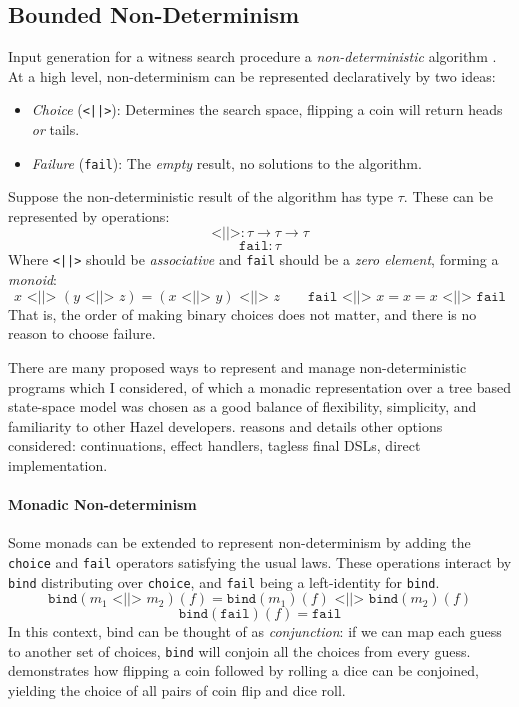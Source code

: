 \subsection{Bounded Non-Determinism}\label{sec:Nondeterminism}
Input generation for a witness search procedure \cite{SearchProc} a \textit{non-deterministic} algorithm \cite{NondeterministicAlgorithms}. At a high level, non-determinism can be represented declaratively by two ideas:
\begin{itemize}
\item \textit{Choice} (\texttt{<||>}): Determines the search space, flipping a coin will return heads \textit{or} tails.
\item \textit{Failure} (\texttt{fail}): The \textit{empty} result, no solutions to the algorithm.
\end{itemize}
Suppose the non-deterministic result of the algorithm has type $\tau$. These can be represented by operations:
\[\texttt{<||>} : \tau \to \tau \to \tau\]
\[\texttt{fail} : \tau\]
Where \texttt{<||>} should be \textit{associative} and \texttt{fail} should be a \textit{zero element}, forming a \textit{monoid}:
\[x \texttt{ <||> } (y \texttt{ <||> } z) = (x \texttt{ <||> } y) \texttt{ <||> } z \qquad \texttt{fail} \texttt{ <||> } x = x = x \texttt{ <||> } \texttt{fail}\]
That is, the order of making binary choices does not matter, and there is no reason to choose failure.

There are many proposed ways to represent and manage non-deterministic programs which I considered, of which a monadic representation over a tree based state-space model was chosen as a good balance of flexibility, simplicity, and familiarity to other Hazel developers.  reasons and details other options considered: continuations, effect handlers, tagless final DSLs, direct implementation.  

\paragraph{Monadic Non-determinism} Some monads can be extended to represent non-determinism by adding the \texttt{choice} and \texttt{fail} operators satisfying the usual laws.
These operations interact by \texttt{bind} distributing over \texttt{choice}, and \texttt{fail} being a left-identity for \texttt{bind}.
\[\texttt{bind}(m_1 \texttt{ <||> } m_2)(f) = \texttt{bind}(m_1)(f) \texttt{ <||> } \texttt{bind}(m_2)(f)\]
\[\texttt{bind}(\texttt{fail})(f) = \texttt{fail}\]
In this context, bind can be thought of as \textit{conjunction}: if we can map each guess to another set of choices, \texttt{bind} will conjoin all the choices from every guess.  demonstrates how flipping a coin followed by rolling a dice can be conjoined, yielding the choice of all pairs of coin flip and dice roll.

